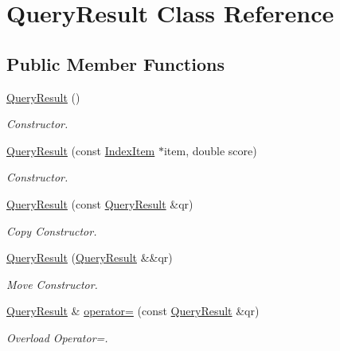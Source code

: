 \hypertarget{class_query_result}{}\section{Query\+Result Class Reference}
\label{class_query_result}
\subsection*{Public Member Functions}
\begin{DoxyCompactItemize}
\item 
\hyperlink{class_query_result_a23c0f8433d60025e81759f569dc08ab8}{Query\+Result} ()
\begin{DoxyCompactList}\small\item\em Constructor. \end{DoxyCompactList}\item 
\hyperlink{class_query_result_a4052497ab00536fed160dd0d0520d15f}{Query\+Result} (const \hyperlink{class_index_item}{Index\+Item} $\ast$item, double score)
\begin{DoxyCompactList}\small\item\em Constructor. \end{DoxyCompactList}\item 
\hyperlink{class_query_result_a702070b121570dbb10b47b264cabaa5f}{Query\+Result} (const \hyperlink{class_query_result}{Query\+Result} \&qr)
\begin{DoxyCompactList}\small\item\em Copy Constructor. \end{DoxyCompactList}\item 
\mbox{\label{class_query_result_a568a9db7e3935e4a24cc63e9ec0c80a7}} 
\hyperlink{class_query_result_a568a9db7e3935e4a24cc63e9ec0c80a7}{Query\+Result} (\hyperlink{class_query_result}{Query\+Result} \&\&qr)
\begin{DoxyCompactList}\small\item\em Move Constructor. \end{DoxyCompactList}\item 
\hyperlink{class_query_result}{Query\+Result} \& \hyperlink{class_query_result_a238ab498750ea7ed31b965a416cc5930}{operator=} (const \hyperlink{class_query_result}{Query\+Result} \&qr)
\begin{DoxyCompactList}\small\item\em Overload Operator=. \end{DoxyCompactList}\item 

\end{DoxyCompactItemize}
